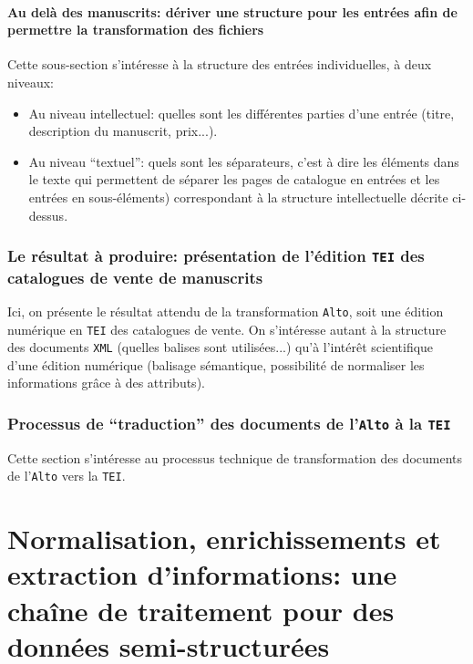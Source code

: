 \documentclass[a4paper, 12pt, twoside]{book}
\newcommand{\alto}{\texttt{Alto}}
\newcommand{\tei}{\texttt{TEI}}
\newcommand{\xml}{\texttt{XML}}
\begin{document}
\subsection{Au delà des manuscrits: dériver une structure pour les entrées afin de permettre la transformation des fichiers}
Cette sous-section s'intéresse à la structure des entrées individuelles, à deux niveaux:
\begin{itemize}
	\item Au niveau intellectuel: quelles sont les différentes parties d'une entrée (titre, description du manuscrit, prix...).
	\item Au niveau \enquote{textuel}: quels sont les séparateurs, c'est à dire les éléments dans le texte qui permettent de séparer les pages de catalogue en entrées et les entrées en sous-éléments) correspondant à la structure intellectuelle décrite ci-dessus.
\end{itemize}


\section{Le résultat à produire: présentation de l'édition \tei{} des catalogues de vente de manuscrits}
Ici, on présente le résultat attendu de la transformation \alto{}, soit une édition numérique en \tei{} des catalogues de vente. On s'intéresse autant à la structure des documents \xml{} (quelles balises sont utilisées...) qu'à l'intérêt scientifique d'une édition numérique (balisage sémantique, possibilité de normaliser les informations grâce à des attributs).

\section{Processus de \enquote{traduction} des documents de l'\alto{} à la \tei{}}
Cette section s'intéresse au processus technique de transformation des documents de l'\alto{} vers la \tei{}.






\part{Normalisation, enrichissements et extraction d'informations: une chaîne de traitement pour des données semi-structurées}

\end{document}
